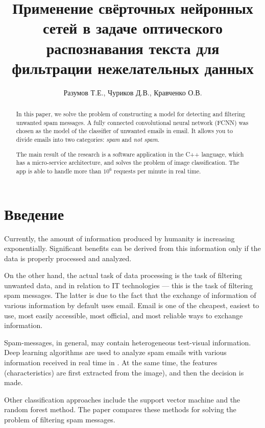 \documentclass[12pt]{article}
\title{Применение свёрточных нейронных сетей в задаче оптического распознавания текста для фильтрации нежелательных данных}
\author{Разумов Т.Е., Чуриков Д.В., Кравченко О.В.}
\begin{document}
\maketitle

\begin{abstract}
In this paper, we solve the problem of constructing a model for detecting and filtering unwanted spam messages. A fully connected convolutional neural network (\textsf{FCNN}) was chosen as the model of the classifier of unwanted emails in email. It allows you to divide emails into two categories: \emph{spam} and \emph{not spam}.

The main result of the research is a software application in the \textsf{C++} language, which has a micro-service architecture, and solves the problem of image classification. The app is able to handle more than $10 ^ 6 $ requests per minute in real time.
\end{abstract}


\section{Введение}
Currently, the amount of information produced by humanity
is increasing exponentially. Significant benefits can be derived from this information only if the data is properly processed and analyzed.

On the other hand, the actual task of data processing is the task
of filtering unwanted data, and in relation to IT technologies --- this is the task of filtering spam messages.
The latter is due to the fact that the exchange of information of various information by default uses email. Email is one of the cheapest, easiest to use, most easily accessible, most official, and most reliable ways to exchange information.

Spam-messages, in general, may contain heterogeneous test-visual information. Deep
learning algorithms are used to analyze spam emails with various information received in real time in \cite{Makkar2021}.
At the same time, the features (characteristics) are first extracted from the image),
and then the decision is made.


Other classification approaches include the support vector machine and the random forest method. The paper \cite{Taylor2020} compares these methods for solving the problem of filtering spam messages.
\end{document}
